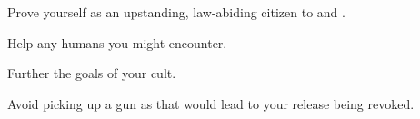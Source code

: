 \documentclass[char]{guildcamp4}
\begin{document}
\begin{itemz}[Goals]
	\item Prove yourself as an upstanding, law-abiding citizen to \cCbad{} and \cCgood{}.
	\item Help any humans you might encounter.
	\item Further the goals of your cult.
	\item Avoid picking up a gun as that would lead to your release being revoked.
\end{itemz}

\begin{itemz}[Notes]
	\item 
\end{itemz}

\begin{contacts}
	\contact{\cTest{}}
\end{contacts}
\end{document}
